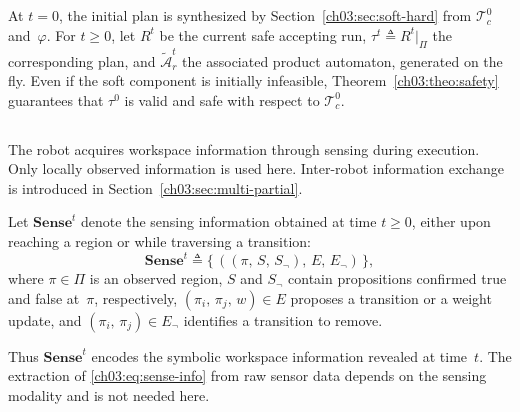 \subsection{}

At $t=0$, the initial plan is synthesized by
Section~\ref{ch03:sec:soft-hard} from $\mathcal{T}_c^0$ and~$\varphi$. For
$t \geq 0$, let $R^t$ be the current safe accepting run,
$\tau^t \triangleq R^t|_{\Pi}$ the corresponding plan, and
$\tilde{\mathcal{A}}_r^t$ the associated product automaton, generated on the
fly. Even if the soft component is initially infeasible,
Theorem~\ref{ch03:theo:safety} guarantees that $\tau^0$ is valid and safe with
respect to $\mathcal{T}_c^0$.

\subsection{}
\label{ch03:subsec:knowledge-update}

The robot acquires workspace information through sensing during execution.
Only locally observed information is used here. Inter-robot information
exchange is introduced in Section~\ref{ch03:sec:multi-partial}.
\begin{revision}
Let $\textbf{Sense}^t$ denote the sensing information obtained
at time $t \geq 0$, either upon reaching a region or while traversing a
transition:
\begin{equation}
\textbf{Sense}^t \triangleq
\{\, ((\pi,\, S,\, S_{\neg}),\, E,\, E_{\neg}) \,\},
\label{ch03:eq:sense-info}
\end{equation}
where $\pi \in \Pi$ is an observed region, $S$ and $S_{\neg}$ contain
propositions confirmed true and false at~$\pi$, respectively,
$(\pi_i,\, \pi_j,\, w) \in E$ proposes a transition or a weight update, and
$(\pi_i,\, \pi_j) \in E_{\neg}$ identifies a transition to remove.
\end{revision}
Thus $\textbf{Sense}^t$ encodes
the symbolic workspace information revealed at time~$t$. The extraction of
\eqref{ch03:eq:sense-info} from raw sensor data depends on the sensing modality
and is not needed here.

\subsection{}\label{ch03:subsubsec:updateT}

